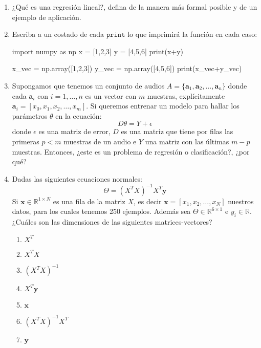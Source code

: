 \documentclass{exam}
\theoremstyle{definition}
\begin{document}
\begin{enumerate}
\item ¿Qué es una regresión lineal?, defina de la manera más formal posible y de un ejemplo de aplicación.
\item Escriba a un costado de cada $\mathtt{print}$ lo que imprimirá la función en cada caso:
    \begin{python}
    import numpy as np
     x = [1,2,3]
     y = [4,5,6]
     print(x+y)
    
     x_vec = np.array([1,2,3])
     y_vec = np.array([4,5,6])
     print(x_vec+y_vec)
 
    \end{python}
\item Supongamos que tenemos un conjunto de audios $A = \{\mathbf{a}_1, \mathbf{a}_2,\dots,\mathbf{a}_n\}$ donde cada $\mathbf{a}_i$ con $i = 1,\dots, n$ es un vector con $m$ muestras, explícitamente $\mathbf{a}_i = [x_0,x_1,x_2,\dots,x_m]$. Si queremos entrenar un modelo para hallar los parámetros $\theta$ en la ecuación:
\begin{equation}
    D \theta = Y + \epsilon
\end{equation}
donde $\epsilon$ es una matriz de error, $D$ es una matriz que tiene por filas las primeras $p<m$ muestras de un audio e $Y$ una matriz con las últimas $m-p$ muestras. Entonces, ¿este es un problema de regresión o clasificación?, ¿por qué?

\item Dadas las siguientes ecuaciones normales:
    \begin{equation}
      \Theta = (X^{T}X)^{-1}X^{T}\mathbf{y}
    \end{equation}
    Si $\mathbf{x} \in \mathbb{R}^{1\times N}$ es una fila de la matriz $X$, es decir $\mathbf{x}=[x_1,x_2,\dots,x_N]$ nuestros datos, para los cuales tenemos 250 ejemplos. Además sea $\Theta\in \mathbb{R}^{6\times 1}$ e $y_i \in \mathbb{R}$. ¿Cuáles son las dimensiones de las siguientes matrices-vectores?
    \begin{enumerate}
        \item $X^{T}$
        \item $X^{T}X$
        \item $(X^{T}X)^{-1}$
        \item $X^{T}\mathbf{y}$
        \item $\mathbf{x}$
        \item $(X^{T}X)^{-1}X^{T}$
        \item $\mathbf{y}$
    \end{enumerate}
\end{enumerate}
\thispagestyle{empty}
\end{document}
